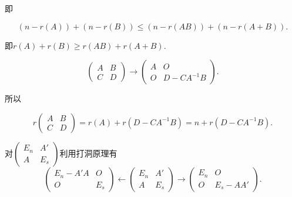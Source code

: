 \documentclass{article}
\begin{document}
即

\begin{equation*}
    \left(n - r \left(A\right)\right) + \left(n - r \left(B\right)\right) \le \left(n - r \left(AB\right)\right) + \left(n - r \left(A + B\right)\right).
\end{equation*}

即$r \left(A\right) + r \left(B\right) \ge r \left(AB\right) + r \left(A + B\right)$.

\vspace{1ex}

\vspace{1ex}
\begin{equation*}
    \left(
    \begin{array}{cc}
        A & B \\
        C & D
    \end{array}
    \right)
    \longrightarrow
    \left(
    \begin{array}{cc}
        A & O          \\
        O & D-CA^{-1}B
    \end{array}
    \right).
\end{equation*}

所以

\begin{equation*}
    r
    \left(
    \begin{array}{cc}
            A & B \\
            C & D
        \end{array}
    \right)
    =
    r \left(A\right) + r \left(D - CA^{-1}B\right)
    =
    n + r \left(D - CA^{-1}B\right).
\end{equation*}


\vspace{1ex}
对$\left(\begin{array}{cc}
            E_n & A'  \\
            A   & E_s
        \end{array}\right)$利用打洞原理有
\begin{equation*}
    \left(
    \begin{array}{cc}
        E_n - A'A & O   \\
        O         & E_s
    \end{array}
    \right)
    \longleftarrow
    \left(
    \begin{array}{cc}
        E_n & A'  \\
        A   & E_s
    \end{array}
    \right)
    \longrightarrow
    \left(
    \begin{array}{cc}
        E_n & O         \\
        O   & E_s - AA'
    \end{array}
    \right).
\end{equation*}
\end{document}
